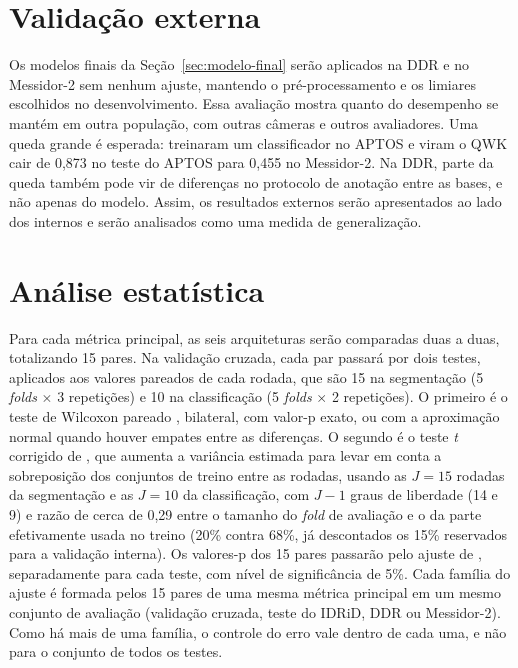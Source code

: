 \section{Validação externa}
\label{sec:validacao-externa}

Os modelos finais da Seção~\ref{sec:modelo-final} serão aplicados na DDR e no Messidor-2 sem nenhum ajuste, mantendo o pré-processamento e os limiares escolhidos no desenvolvimento. Essa avaliação mostra quanto do desempenho se mantém em outra população, com outras câmeras e outros avaliadores. Uma queda grande é esperada:  treinaram um classificador no APTOS e viram o QWK cair de 0,873 no teste do APTOS para 0,455 no Messidor-2. Na DDR, parte da queda também pode vir de diferenças no protocolo de anotação entre as bases, e não apenas do modelo. Assim, os resultados externos serão apresentados ao lado dos internos e serão analisados como uma medida de generalização.

\section{Análise estatística}
\label{sec:analise-estatistica}

Para cada métrica principal, as seis arquiteturas serão comparadas duas a duas, totalizando 15 pares. Na validação cruzada, cada par passará por dois testes, aplicados aos valores pareados de cada rodada, que são 15 na segmentação (5 \textit{folds} $\times$ 3 repetições) e 10 na classificação (5 \textit{folds} $\times$ 2 repetições). O primeiro é o teste de Wilcoxon pareado \cite{wilcoxon1945}, bilateral, com valor-p exato, ou com a aproximação normal quando houver empates entre as diferenças. O segundo é o teste \textit{t} corrigido de , que aumenta a variância estimada para levar em conta a sobreposição dos conjuntos de treino entre as rodadas, usando as $J = 15$ rodadas da segmentação e as $J = 10$ da classificação, com $J - 1$ graus de liberdade (14 e 9) e razão de cerca de 0,29 entre o tamanho do \textit{fold} de avaliação e o da parte efetivamente usada no treino (20\% contra 68\%, já descontados os 15\% reservados para a validação interna). Os valores-p dos 15 pares passarão pelo ajuste de , separadamente para cada teste, com nível de significância de 5\%. Cada família do ajuste é formada pelos 15 pares de uma mesma métrica principal em um mesmo conjunto de avaliação (validação cruzada, teste do IDRiD, DDR ou Messidor-2). Como há mais de uma família, o controle do erro vale dentro de cada uma, e não para o conjunto de todos os testes.


